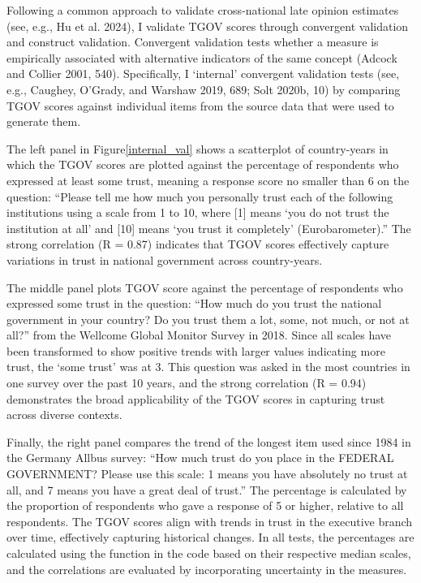 \documentclass[
  12pt,
]{article}
\begin{document}
Following a common approach to validate cross-national late opinion estimates (see, e.g., Hu et al. 2024), I validate TGOV scores through convergent validation and construct validation.
Convergent validation tests whether a measure is empirically associated with alternative indicators of the same concept (Adcock and Collier 2001, 540).
Specifically, I `internal' convergent validation tests (see, e.g., Caughey, O'Grady, and Warshaw 2019, 689; Solt 2020b, 10) by comparing TGOV scores against individual items from the source data that were used to generate them.

The left panel in Figure\nobreakspace{}\ref{internal_val} shows a scatterplot of country-years in which the TGOV scores are plotted against the percentage of respondents who expressed at least some trust, meaning a response score no smaller than 6 on the question: ``Please tell me how much you personally trust each of the following institutions using a scale from 1 to 10, where {[}1{]} means `you do not trust the institution at all' and {[}10{]} means `you trust it completely' (Eurobarometer).''
The strong correlation (R = 0.87) indicates that TGOV scores effectively capture variations in trust in national government across country-years.

The middle panel plots TGOV score against the percentage of respondents who expressed some trust in the question: ``How much do you trust the national government in your country? Do you trust them a lot, some, not much, or not at all?'' from the Wellcome Global Monitor Survey in 2018.
Since all scales have been transformed to show positive trends with larger values indicating more trust, the `some trust' was at 3.
This question was asked in the most countries in one survey over the past 10 years, and the strong correlation (R = 0.94) demonstrates the broad applicability of the TGOV scores in capturing trust across diverse contexts.

Finally, the right panel compares the trend of the longest item used since 1984 in the Germany Allbus survey: ``How much trust do you place in the FEDERAL GOVERNMENT? Please use this scale: 1 means you have absolutely no trust at all, and 7 means you have a great deal of trust.''
The percentage is calculated by the proportion of respondents who gave a response of 5 or higher, relative to all respondents.
The TGOV scores align with trends in trust in the executive branch over time, effectively capturing historical changes.
In all tests, the percentages are calculated using the function in the code based on their respective median scales, and the correlations are evaluated by incorporating uncertainty in the measures.
\end{document}
